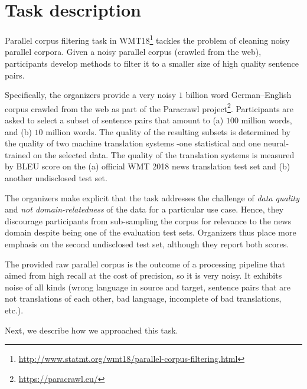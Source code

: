 \section{Task description}

Parallel corpus filtering task in WMT18\footnote{\url{http://www.statmt.org/wmt18/parallel-corpus-filtering.html}} tackles the problem of cleaning noisy parallel corpora. Given a noisy parallel corpus (crawled from the web), participants develop methods to filter it to a smaller size of high quality sentence pairs.

Specifically, the organizers provide a very noisy $1$ billion word German--English corpus crawled from the web as part of the Paracrawl project\footnote{\url{https://paracrawl.eu/}}. Participants are asked to select a subset of sentence pairs that amount to (a) $100$ million words, and (b) $10$ million words. The quality of the resulting subsets is determined by the quality of two machine translation systems -one statistical and one neural- trained on the selected data. The quality of the translation systems is measured by BLEU score on the (a) official WMT 2018 news translation test set and (b) another undisclosed test set.

The organizers make explicit that the task addresses the challenge of \emph{data quality} and \emph{not domain-relatedness} of the data for a particular use case. Hence, they discourage participants from sub-sampling the corpus for relevance to the news domain despite being one of the evaluation test sets. Organizers thus place more emphasis on the second undisclosed test set, although they report both scores.

The provided raw parallel corpus is the outcome of a processing pipeline that aimed from high recall at the cost of precision, so it is very noisy. It exhibits noise of all kinds (wrong language in source and target, sentence pairs that are not translations of each other, bad language, incomplete of bad translations, etc.).

Next, we describe how we approached this task.